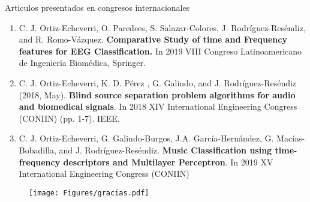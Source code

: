 \documentclass[10pt]{beamer}
\begin{document}
\begin{frame}{Articulos presentados en congresos internacionales}
\begin{enumerate}
\item C. J. Ortiz-Echeverri, O. Paredees, S. Salazar-Colores, J. Rodríguez-Reséndiz, and R. Romo-Vázquez. \textbf{Comparative Study of time and Frequency features for EEG Classification.} In 2019 VIII Congreso Latinoamericano de Ingeniería Biomédica, Springer.

\item  C. J. Ortiz-Echeverri, K. D. Pérez , G. Galindo, and J. Rodríguez-Reséndiz (2018, May). \textbf{Blind source separation problem algorithms for audio and biomedical signals}. In 2018 XIV International Engineering Congress (CONIIN) (pp. 1-7). IEEE.


\item C. J. Ortiz-Echeverri, G. Galindo-Burgos, J.A. García-Hernández, G. Macías-Bobadilla, and J. Rodríguez-Reséndiz. \textbf{Music Classification using time-frequency descriptors and Multilayer Perceptron}. In 2019 XV International Engineering Congress (CONIIN) 
\end{enumerate}
    
\end{frame}

\begin{frame}{}

\begin{figure}[h]
\centering
\texttt{[image: Figures/gracias.pdf]}

\label{train_test}
\end{figure}

\end{frame}



\end{document}
